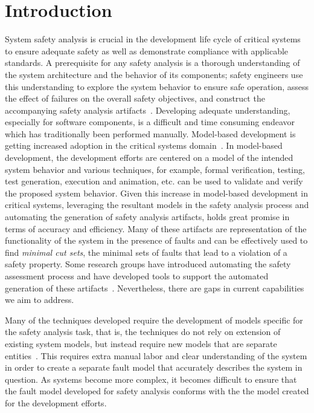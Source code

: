 \chapter{Introduction}
\label{chap:intro}

System safety analysis is crucial in the development life cycle of critical systems to ensure adequate safety as well as demonstrate compliance with applicable standards. A prerequisite for any safety analysis is a thorough understanding of the system architecture and the behavior of its components; safety engineers use this understanding to explore the system behavior to ensure safe operation, assess the effect of failures on the overall safety objectives, and construct the accompanying safety analysis artifacts~\cite{SAE:ARP4761,SAE:ARP4754A}. Developing adequate understanding, especially for software components, is a difficult and time consuming endeavor which has traditionally been performed manually. Model-based development is getting increased adoption in the critical systems domain~\cite{Joshi05:Dasc,CAV2015:BoCiGrMa,info17:HaLuHo,5979344,Gudemann:2010:FQQ:1909626.1909813}. In model-based development, the development efforts are centered on a model of the intended system behavior and various techniques, for example, formal verification, testing, test generation, execution and animation, etc. can be used to validate and verify the proposed system behavior. Given this increase in model-based development in critical systems, leveraging the resultant models in the safety analysis process and automating the generation of safety analysis artifacts, holds great promise in terms of accuracy and efficiency. Many of these artifacts are representation of the functionality of the system in the presence of faults and can be effectively used to find \textit{minimal cut sets}, the minimal sets of faults that lead to a violation of a safety property. Some research groups have introduced automating the safety assessment process and have developed tools to support the automated generation of these artifacts~\cite{Joshi05:SafeComp,CAV2015:BoCiGrMa,10.1007/978-3-319-11936-6-7}. Nevertheless, there are gaps in current capabilities we aim to address. 

Many of the techniques developed require the development of models specific for the safety analysis task, that is, the techniques do not rely on extension of existing system models, but instead require new models that are separate entities~\cite{symbAltaRica, DBLP:conf/tacas/BittnerBCCGGMMZ16, info8010007, Gudemann:2010:FQQ:1909626.1909813}. This requires extra manual labor and clear understanding of the system in order to create a separate fault model that accurately describes the system in question. As systems become more complex, it becomes difficult to ensure that the fault model developed for safety analysis conforms with the the model created for the development efforts. 

